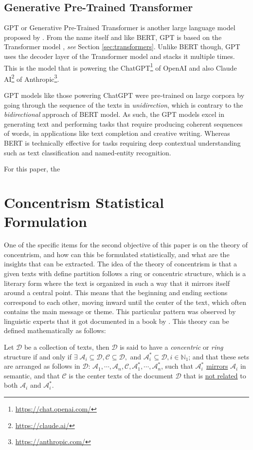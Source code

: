 \subsection{Generative Pre-Trained Transformer}
GPT or Generative Pre-Trained Transformer is another large language model proposed by \cite{radford2018improving}. From the name itself and like BERT, GPT is based on the Transformer model \cite{vaswani2017attention}, \textit{see} Section \ref{sec:transformers}. Unlike BERT though, GPT uses the decoder layer of the Transformer model and stacks it multiple times. This is the model that is powering the ChatGPT\footnote{\url{https://chat.openai.com/}} of OpenAI and also Claude AI\footnote{\url{https://claude.ai/}} of Anthropic\footnote{\url{https://anthropic.com/}}.

GPT models like those powering ChatGPT were pre-trained on large corpora by going through the sequence of the texts in \textit{unidirection}, which is contrary to the \textit{bidirectional} approach of BERT model. As such, the GPT models excel in generating text and performing tasks that require producing coherent sequences of words, in applications like text completion and creative writing. Whereas BERT is technically effective for tasks requiring deep contextual understanding such as text classification and named-entity recognition.

For this paper, the 
\section{Concentrism Statistical Formulation}
One of the specific items for the second objective of this paper is on the theory of concentrism, and how can this be formulated statistically, and what are the insights that can be extracted. The idea of the theory of concentrism is that a given texts with define partition follows a ring or concentric structure, which is a literary form where the text is organized in such a way that it mirrors itself around a central point. This means that the beginning and ending sections correspond to each other, moving inward until the center of the text, which often contains the main message or theme. This particular pattern was observed by linguistic experts that it got documented in a book by . This theory can be defined mathematically as follows:

\begin{defnx}[Concentric]\label{defn:concentric}
    Let $\mathscr{D}$ be a collection of texts, then $\mathscr{D}$ is said to have a \textit{concentric} or \textit{ring} structure if and only if $\exists\;\mathscr{A}_i\subseteq\mathscr{D},\mathscr{C}\subseteq\mathscr{D},$ and $\mathscr{A}_i^{*}\subseteq\mathscr{D},i\in\mathbb{N}_1$; and that these sets are arranged as follows in $\mathscr{D}$:  $\mathscr{A}_1,\cdots,\mathscr{A}_n,\mathscr{C},\mathscr{A}_1^{*},\cdots,\mathscr{A}_n^{*}$, such that $\mathscr{A}_i^{*}$ \underline{mirrors} $\mathscr{A}_i$ in semantic, and that $\mathscr{C}$ is the center texts of the document $\mathscr{D}$ that is \underline{not related} to both $\mathscr{A}_i$ and $\mathscr{A}_i^{*}$.
\end{defnx}

